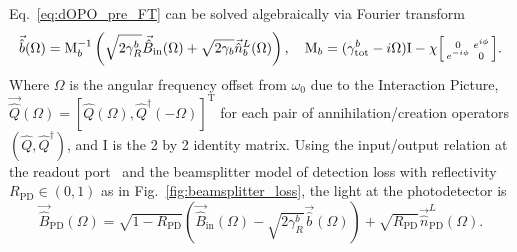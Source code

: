Eq.~\ref{eq:dOPO_pre_FT} can be solved algebraically via Fourier transform~\cite{} %
\begin{equation}
\label{eq:dOPO_FT_vectorised}
\vec{\hat b}(\Omega)=\text{M}_b^{-1}\left(\sqrt{2\gamma^b_R}\vec{\hat{B}}_\mathrm{in}(\Omega) + \sqrt{2\gamma_b}\vec{\hat{n}}^L_b(\Omega)\right),\quad\text{M}_b=(\gamma^b_\mathrm{tot}-i \Omega)\text{I}-\chi \begin{bsmallmatrix}0 & e^{i\phi} \\e^{-i\phi} & 0\end{bsmallmatrix}.
\end{equation}
Where $\Omega$ is the angular frequency offset from $\omega_0$ due to the Interaction Picture, %
$\vec{\hat{Q}}(\Omega)=[\hat{Q}(\Omega),\hat{Q}^\dag(-\Omega)]^\text{T}$ for each pair of annihilation/creation operators $(\hat Q, \hat Q^\dag)$, and $\text{I}$  is the 2 by 2 identity matrix.
Using the input/output relation at the readout port~\cite{} and the beamsplitter model of detection loss with reflectivity $R_\text{PD}\in(0,1)$ as in Fig.~\ref{fig:beamsplitter_loss}, the light at the photodetector is 
\begin{equation}
\label{eq:dOPO_IO}\vec{\hat{B}}_\mathrm{PD}(\Omega)=\sqrt{1-R_\text{PD}}\left(\vec{\hat{B}}_\mathrm{in}(\Omega)-\sqrt{2\gamma^b_R}\vec{\hat b}(\Omega)\right)+\sqrt{R_\text{PD}}\vec{\hat n}^L_\text{PD}(\Omega).
\end{equation} 
